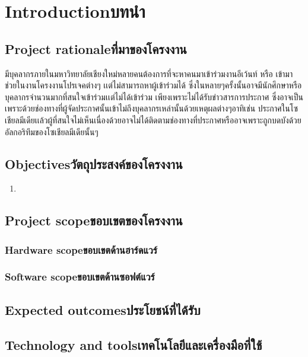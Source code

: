 \chapter{\ifenglish Introduction\else บทนำ\fi}

\section{\ifenglish Project rationale\else ที่มาของโครงงาน\fi}
มีบุคลากรภายในมหาวิทยาลัยเชียงใหม่หลายคนต้องการที่จะหาคนมาเข้าร่วมงานอีเว้นท์ หรือ เข้ามาช่วยในงานโครงงานโปรเจคต่างๆ เเต่ไม่สามารถหาผู้เข้าร่วมได้ ซึ่งในหลายๆครั้งนั้นอาจมีนักศึกษาหรือบุคลากรจำนวนมากที่สนใจเข้าร่วมเเต่ไม่ได้เข้าร่วม เพียงเพราะไม่ได้รับข่าวสารการประกาศ ซึ่งอาจเป็นเพราะด้วยช่องทางที่ผู้จัดประกาศนั้นเข้าไม่ถึงบุคลากรเหล่านั้นด้วยเหตุผลต่างๆอาทิเช่น ประกาศในโซเชียลมีเดียเเล้วผู้ที่สนใจไม่เห็นเนื่องด้วยอาจไม่ได้ติดตามช่องทางที่ประกาศหรืออาจเพราะถูกบดบังด้วยอัลกอริทึมของโซเชียลมีเดียนั้นๆ

\section{\ifenglish Objectives\else วัตถุประสงค์ของโครงงาน\fi}
\begin{enumerate}
    \item
\end{enumerate}

\section{\ifenglish Project scope\else ขอบเขตของโครงงาน\fi}

\subsection{\ifenglish Hardware scope\else ขอบเขตด้านฮาร์ดแวร์\fi}

\subsection{\ifenglish Software scope\else ขอบเขตด้านซอฟต์แวร์\fi}

\section{\ifenglish Expected outcomes\else ประโยชน์ที่ได้รับ\fi}

\section{\ifenglish Technology and tools\else เทคโนโลยีและเครื่องมือที่ใช้\fi}

